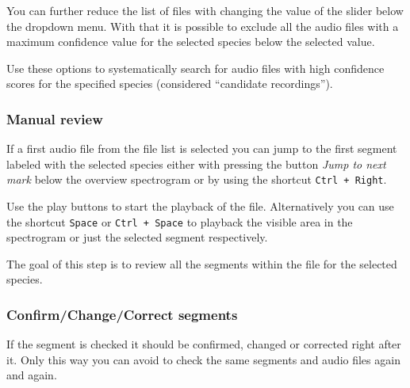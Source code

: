 \documentclass{scrartcl}
\begin{document}
You can further reduce the list of files with changing the value of the slider below the dropdown menu.
With that it is possible to exclude all the audio files with a maximum confidence value for the selected species below the selected value.

Use these options to systematically search for audio files with high confidence scores for the specified species (considered ``candidate recordings'').
\subsubsection{Manual review}
If a first audio file from the file list is selected you can jump to the first segment labeled with the selected species either with pressing the button \textit{Jump to next mark} below the overview spectrogram or by using the shortcut \texttt{Ctrl + Right}.

Use the play buttons to start the playback of the file.
Alternatively you can use the shortcut \texttt{Space} or \texttt{Ctrl + Space} to playback the visible area in the spectrogram or just the selected segment respectively.

The goal of this step is to review all the segments within the file for the selected species.

\subsubsection{Confirm/Change/Correct segments}
If the segment is checked it should be confirmed, changed or corrected right after it.
Only this way you can avoid to check the same segments and audio files again and again.
\end{document}
